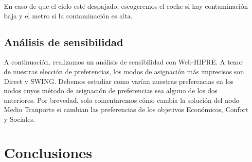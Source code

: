 \documentclass[12pt,a4paper,twoside,openright,titlepage,final]{article}
\begin{document}
En caso de que el cielo esté despajado, escogeremos el coche si hay contaminación baja y el metro si la contaminación es alta.\\

\subsection{Análisis de sensibilidad}

A continuación, realizamos un análisis de sensibilidad con Web-HIPRE. A tenor de nuestras elección de preferencias, los modos de asignación más imprecisos son Direct y SWING. Debemos estudiar como varían nuestras preferencias en los nodos cuyos método de asignación de preferencias sea alguno de los dos anteriores. Por brevedad, solo comentaremos cómo cambia la solución del nodo Medio Tranporte si cambian las preferencias de los objetivos Económicos, Confort y Sociales. 



\section{Conclusiones}
\end{document}
